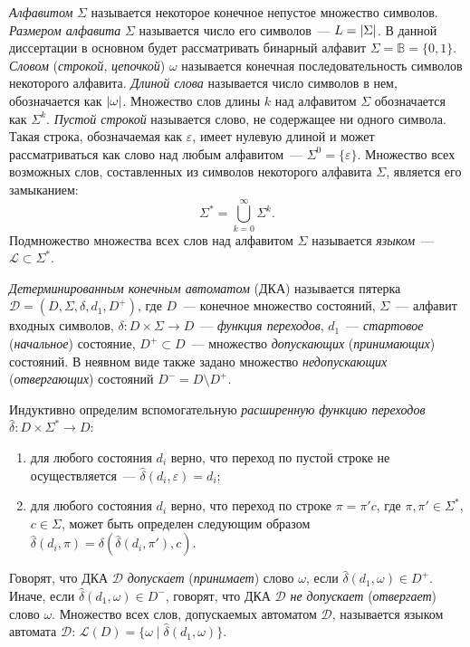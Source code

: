 \emph{Алфавитом} $\Sigma$ называется некоторое конечное непустое множество символов.
\emph{Размером алфавита} $\Sigma$ называется число его символов~{---} $L = \lvert\Sigma\rvert$.
В данной диссертации в основном будет рассматривать бинарный алфавит $\Sigma = \mathbb{B} = \{0, 1\}$.
\emph{Словом} (\emph{строкой}, \emph{цепочкой}) $\omega$ называется конечная последовательность символов некоторого алфавита. 
\emph{Длиной слова} называется число символов в нем, обозначается как $\lvert\omega\rvert$.
Множество слов длины $k$ над алфавитом $\Sigma$ обозначается как $\Sigma^{k}$.
\emph{Пустой строкой} называется слово, не содержащее ни одного символа.
Такая строка, обозначаемая как $\varepsilon$, имеет нулевую длиной и может рассматриваться как слово над любым алфавитом~{---} $\Sigma^{0}=\{\varepsilon\}$.
Множество всех возможных слов, составленных из символов некоторого алфавита $\Sigma$, является его замыканием:
$$\Sigma^{*} = \bigcup_{k=0}^{\infty}\Sigma^{k}.$$
Подмножество множества всех слов над алфавитом $\Sigma$ называется \emph{языком}~--- $\mathcal{L} \subset \Sigma^{*}$.

\emph{Детерминированным конечным автоматом} (ДКА) называется пятерка $\mathcal{D} = \left(D,\Sigma,\delta,d_{1},D^{+}\right)$, где $D$~{---} конечное множество состояний, $\Sigma$~{---} алфавит входных символов, $\delta:D \times \Sigma \rightarrow D$~{---} \emph{функция переходов}, $d_{1}$~{---} \emph{стартовое} (\emph{начальное}) состояние, $D^{+} \subset D$~{---} множество \emph{допускающих} (\emph{принимающих}) состояний. 
В неявном виде также задано множество \emph{недопускающих} (\emph{отвергающих}) состояний $D^{-} = D \setminus D^{+}$.

Индуктивно определим вспомогательную \emph{расширенную функцию переходов} $\hat{\delta}: D \times \Sigma^{*} \rightarrow D$:
\begin{enumerate}
  \item для любого состояния $d_{i}$ верно, что переход по пустой строке не осуществляется~{---} $\hat{\delta}\left(d_{i},\varepsilon\right) = d_{i}$;
  \item для любого состояния $d_{i}$ верно, что переход по строке $\pi = \pi'c$, где $\pi,\pi' \in \Sigma^{*}$, $c \in \Sigma$, может быть определен следующим образом $\hat{\delta}\left(d_{i}, \pi\right) = \delta\left(\hat{\delta}\left(d_{i}, \pi'\right), c\right)$.
\end{enumerate}
Говорят, что ДКА $\mathcal{D}$ \emph{допускает} (\emph{принимает}) слово $\omega$, если $\hat{\delta}\left(d_{1}, \omega\right) \in D^{+}$. 
Иначе, если $\hat{\delta}\left(d_{1}, \omega\right) \in D^{-}$, говорят, что ДКА $\mathcal{D}$ \emph{не допускает} (\emph{отвергает}) слово $\omega$. 
Множество всех слов, допускаемых автоматом $\mathcal{D}$, называется языком автомата $\mathcal{D}$: $\mathcal{L}\left(D\right) = \{\omega \mid \hat{\delta}\left(d_{1}, \omega \right)\}$.

